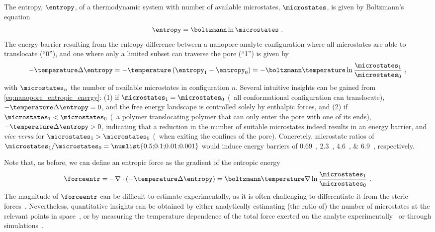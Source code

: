 The entropy, $\entropy$, of a thermodynamic system with number of available microstates, $\microstates$, is
given by Boltzmann's equation~\cite{Neumann-1980}
%
\begin{equation}\label{eq:nanopores_entropy}
  \entropy = \boltzmann \ln \microstates \text{ .}
\end{equation}
%
The energy barrier resulting from the entropy difference between a nanopore-analyte configuration where all
microstates are able to translocate (``0''), and one where only a limited subset can traverse the pore (``1'')
is given by
%
\begin{equation}\label{eq:nanopore_entropic_energy}
  - \temperature \Delta \entropy = - \temperature \left( \entropy_1 - \entropy_0\right)
  = - \boltzmann \temperature \ln \dfrac{\microstates_1}{\microstates_0}
  \text{ ,}
\end{equation}
%
with $\microstates_n$ the number of available microstates in configuration $n$. Several intuitive insights can
be gained from \cref{eq:nanopore_entropic_energy}: (1) if $\microstates_1 = \microstates_0$ (\eg~all
conformational configuration can translocate), $- \temperature \Delta \entropy = 0$, and the free energy
landscape is controlled solely by enthalpic forces, and (2) if $\microstates_1 < \microstates_0$ (\eg~a
polymer translocating polymer that can only enter the pore with one of its ends), $- \temperature \Delta
\entropy > 0$, indicating that a reduction in the number of suitable microstates indeed results in an energy
barrier, and \textit{vice versa} for $\microstates_1 > \microstates_0$ (\eg~when exiting the confines of the
pore). Concretely, microstate ratios of $\microstates_1 / \microstates_0 =
\text{\numlist{0.5;0.1;0.01;0.001}}$ would induce energy barriers of \SIlist{0.69;2.3;4.6;6.9}{\kbt},
respectively.

Note that, as before, we can define an entropic force as the gradient of the entropic
energy~\cite{Neumann-1980}
%
\begin{equation}\label{eq:nanopore_entropic_force}
  \forceentr = - \nabla \cdot (- \temperature \Delta \entropy )  
             = \boltzmann \temperature \nabla \ln \dfrac{\microstates_1}{\microstates_0}
  \text{ .}
\end{equation}
%
The magnitude of $\forceentr$ can be difficult to estimate experimentally, as it is often challenging to
differentiate it from the steric forces~\cite{Buchsbaum-2013}. Nevertheless, quantitative insights can be
obtained by either analytically estimating (the ratio of) the number of microstates at the relevant points in
space~\cite{Tian-2003,Muthukumar-2010,Cressiot-2015}, or by measuring the temperature dependence of the total
force exerted on the analyte experimentally~\cite{Meller-2002,Payet-2015} or through
simulations~\cite{Tian-2003,Matysiak-2006,Vaitheeswaran-2014,Luo-2017}.



